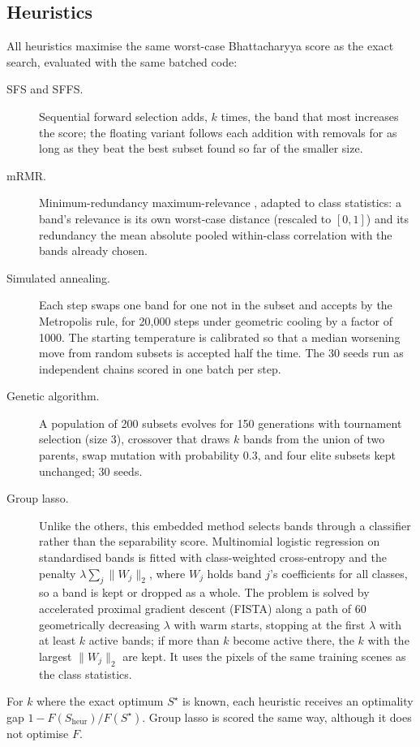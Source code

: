 \documentclass[11pt]{article}
\begin{document}
\subsection{Heuristics}
\label{sec:heuristics}
All heuristics maximise the same worst-case Bhattacharyya score as the exact
search, evaluated with the same batched code:
\begin{description}
  \item[SFS and SFFS.] Sequential forward selection adds, $k$ times, the band
    that most increases the score; the floating variant \citep{pudil1994}
    follows each addition with removals for as long as they beat the best
    subset found so far of the smaller size.
  \item[mRMR.] Minimum-redundancy maximum-relevance \citep{peng2005}, adapted
    to class statistics: a band's relevance is its own worst-case distance
    (rescaled to $[0,1]$) and its redundancy the mean absolute pooled
    within-class correlation with the bands already chosen.
  \item[Simulated annealing.] Each step swaps one band for one not in the
    subset and accepts by the Metropolis rule, for 20{,}000 steps under
    geometric cooling by a factor of 1000. The starting temperature is
    calibrated so that a median worsening move from random subsets is accepted
    half the time. The 30 seeds run as independent chains scored in one batch
    per step.
  \item[Genetic algorithm.] A population of 200 subsets evolves for 150
    generations with tournament selection (size 3), crossover that draws $k$
    bands from the union of two parents, swap mutation with probability 0.3,
    and four elite subsets kept unchanged; 30 seeds.
  \item[Group lasso.] Unlike the others, this embedded method selects bands
    through a classifier rather than the separability score. Multinomial
    logistic regression on standardised bands is fitted with class-weighted
    cross-entropy and the penalty $\lambda\sum_j\lVert W_j\rVert_2$, where
    $W_j$ holds band $j$'s coefficients for all classes, so a band is kept or
    dropped as a whole. The problem is solved by accelerated proximal gradient
    descent (FISTA) along a path of 60 geometrically decreasing $\lambda$ with
    warm starts, stopping at the first $\lambda$ with at least $k$ active
    bands; if more than $k$ become active there, the $k$ with the largest
    $\lVert W_j\rVert_2$ are kept. It uses the pixels of the same training
    scenes as the class statistics.
\end{description}
For $k$ where the exact optimum $S^\star$ is known, each heuristic receives an
optimality gap $1 - F(S_\mathrm{heur})/F(S^\star)$. Group lasso is scored the
same way, although it does not optimise $F$.
\end{document}
